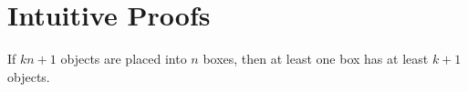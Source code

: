 \chapter{Intuitive Proofs}


\begin{principle}
 If $kn+1$ objects are placed into $n$ boxes,
then at least one box has at least $k+1$ objects.
\end{principle}
